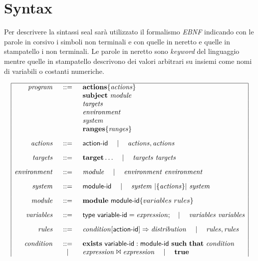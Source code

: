 \section{Syntax}
Per descrivere la sintassi \ac{seal} sarà utilizzato il formalismo \emph{EBNF} indicando con le parole in corsivo i simboli non terminali e con quelle in neretto e quelle in stampatello i non terminali. Le parole in neretto sono \emph{keyword} del linguaggio mentre quelle in stampatello descrivono dei valori arbitrari su insiemi come nomi di variabili o costanti numeriche.

\begin{table} %
$$
\begin{array}{|rcl|}
\hline
\mathit{program} &::=& \mathbf{actions} \{ \mathit{actions} \} \\
	&& \mathbf{subject} \Space \mathit{module} \\
	&& \mathit{targets} \\
	&& \mathit{environment} \\
	&& \mathit{system} \\
	&& \mathbf{ranges} \{ \mathit{ranges} \}
	\\[.3cm]
\mathit{actions} &::=& \x{action}\textrm{-}\x{id} \Sep \mathit{actions} , \mathit{actions}
	\\[.3cm]
\mathit{targets} &::=& \mathbf{target} \dots \Sep \mathit{targets} \Space \mathit{targets}
	\\[.3cm]
\mathit{environment} &::=& \mathit{module} \Sep \mathit{environment} \Space \mathit{environment}
	\\[.3cm]
\mathit{system} &::=& \x{module}\textrm{-}\x{id} \Sep \mathit{system} \Par{\{\mathit{actions}\}} \mathit{system}
	\\[.3cm]
\mathit{module} &::=& \mathbf{module} \Space \x{module}\textrm{-}\x{id} \{ variables \Space rules \}
	\\[.3cm]
\mathit{variables} &::=& \x{type} \Space \x{variable}\textrm{-}\x{id} = \mathit{expression}; \Sep \mathit{variables} \Space \mathit{variables}
	\\[.3cm]
\mathit{rules} &::=& \mathit{condition} [ \x{action}\textrm{-}\x{id}]\Rightarrow \mathit{distribution} \Sep \mathit{rules},\mathit{rules}
	\\[.3cm]
\mathit{condition} &::=& \mathbf{exists} \Space \x{variable}\textrm{-}\x{id}:\x{module}\textrm{-}\x{id} \Space \mathbf{such}\Space\mathbf{that} \Space \mathit{condition} \\
	& \Sep & \mathit{expression} \Join \mathit{expression} \Sep \mathbf{true} \\

\end{array}$$
\end{table}
